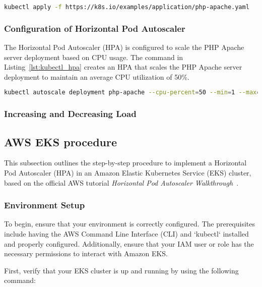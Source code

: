 \begin{lstlisting}[language=bash, label={lst:kubectl_php_apache},caption={Deploying the PHP Apache server}]
  kubectl apply -f https://k8s.io/examples/application/php-apache.yaml
\end{lstlisting}

\subsubsection{Configuration of Horizontal Pod Autoscaler}
The Horizontal Pod Autoscaler (HPA) is configured to scale the PHP Apache server deployment based on CPU usage.
The command in Listing~\ref{lst:kubectl_hpa} creates an HPA that scales the PHP Apache server deployment to maintain an average CPU utilization of 50\%.

\begin{lstlisting}[language=bash, label={lst:kubectl_hpa},caption={Configuring the Horizontal Pod Autoscaler}]
  kubectl autoscale deployment php-apache --cpu-percent=50 --min=1 --max=10
\end{lstlisting}


\subsubsection{Increasing and Decreasing Load}

\subsection{AWS EKS procedure}

This subsection outlines the step-by-step procedure to implement a Horizontal Pod Autoscaler (HPA) in an Amazon Elastic Kubernetes Service (EKS) cluster, based on the official AWS tutorial \textit{Horizontal Pod Autoscaler Walkthrough}~\cite{AwsHorizontalPodAutoescaler}.

\subsubsection{Environment Setup}

To begin, ensure that your environment is correctly configured. The prerequisites include having the AWS Command Line Interface (CLI) and `kubectl` installed and properly configured. Additionally, ensure that your IAM user or role has the necessary permissions to interact with Amazon EKS.

First, verify that your EKS cluster is up and running by using the following command:

